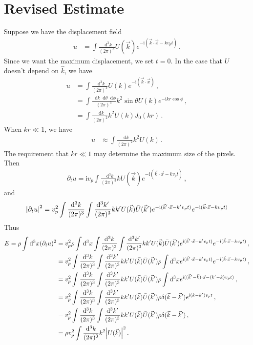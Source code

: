 \documentclass{article}
\newcommand*\diff{\mathop{}\!\mathrm{d}}
\newcommand*\te[1]{\text{#1}}
\newcommand*\f[2]{\frac{#1}{#2}}
\newcommand*\I{\te{i}}
\begin{document}
\section{Revised Estimate}
Suppose we have the displacement field
\begin{align}
u &= \int\f{\diff^3 k}{(2\pi)^3}U(\vec k)e^{-\I(\vec k\cdot \vec x-k v_p t)}\,.
\end{align}
Since we want the maximum displacement, we set $t=0$. In the case that $U$ doesn't depend on $\hat k$, we have
\begin{align}
u &=\int\f{\diff^3 k}{(2\pi)^3}U(k)e^{-\I(\vec k\cdot \vec x)}\,,\\
&=\int\f{\diff k\diff\theta\diff\phi}{(2\pi)^3}k^2\sin\theta U( k)e^{-\I k r \cos\phi}\,,\\
&=\int\f{\diff k}{(2\pi)^2}k^2U( k) J_0(k r)\,.
\end{align}
When $kr\ll 1$, we have
\begin{align}
u&\approx \int\f{\diff k}{(2\pi)^2}k^2U(k)\,.
\end{align}
The requirement that $kr\ll 1$ may determine the maximum size of the pixels. Then
\begin{align}
\partial_t u =\I v_p\int\f{\diff^3 k}{(2\pi)^3}kU(\vec k)e^{-\I(\vec k\cdot \vec x-k v_p t)}\,,
\end{align}
and
\begin{align}
\abs{\partial_t u}^2 = v_p^2\int\f{\diff^3 k}{(2\pi)^3}\int\f{\diff^3 k'}{(2\pi)^3}kk'U(\vec k)\bar U(\vec k')e^{-\I(\vec k'\cdot \vec x-k' v_p t)}e^{-\I(\vec k\cdot \vec x-k v_p t)}
\end{align}
Thus
\begin{align}
E = \rho\int\diff^3 x (\partial_t u)^2 &= v_p^2\rho\int\diff^3 x\int\f{\diff^3 k}{(2\pi)^3}\int\f{\diff^3 k'}{(2\pi)^3}kk'U(\vec k)\bar U(\vec k')e^{\I(\vec k'\cdot \vec x-k' v_p t)}e^{-\I(\vec k\cdot \vec x-k v_p t)}\,,\\
&=v_p^2\int\f{\diff^3 k}{(2\pi)^3}\int\f{\diff^3 k'}{(2\pi)^3}kk'U(\vec k)\bar U(\vec k')\rho\int\diff^3 xe^{\I(\vec k'\cdot \vec x-k' v_p t)}e^{-\I(\vec k\cdot \vec x-k v_p t)}\,,\\
&=v_p^2\int\f{\diff^3 k}{(2\pi)^3}\int\f{\diff^3 k'}{(2\pi)^3}kk'U(\vec k)\bar U(\vec k')\rho\int\diff^3 xe^{\I((\vec k'-\vec k)\cdot \vec x-(k'-k) v_p t)}\,,\\
&=v_p^2\int\f{\diff^3 k}{(2\pi)^3}\int\f{\diff^3 k'}{(2\pi)^3}kk'U(\vec k)\bar U(\vec k')\rho \delta(\vec k-\vec k')e^{\I(k-k') v_p t}\,,\\
&=v_p^2\int\f{\diff^3 k}{(2\pi)^3}\int\f{\diff^3 k'}{(2\pi)^3}kk'U(\vec k)\bar U(\vec k')\rho \delta(\vec k-\vec k')\,,\\
&=\rho v_p^2\int\f{\diff^3 k}{(2\pi)^3}k^2\abs{U(\vec k)}^2\,.
\end{align}
\end{document}
